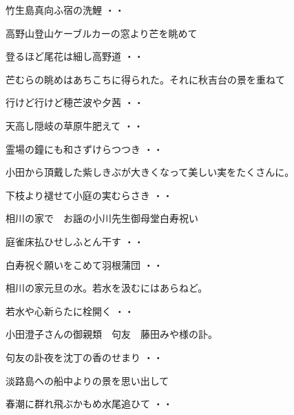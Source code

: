 \begin{shiika}竹生島真向ふ宿の洗鯉
\hfill{・・}\end{shiika}
\vspace{0.6cm}
高野山登山ケーブルカーの窓より芒を眺めて
\begin{shiika}登るほど尾花は細し高野道
\hfill{・・}\end{shiika}
\vspace{0.6cm}
芒むらの眺めはあちこちに得られた。それに秋吉台の景を重ねて
\begin{shiika}行けど行けど穂芒波や夕茜
\hfill{・・}\end{shiika}
\vspace{0.6cm}
\begin{shiika}天高し隠岐の草原牛肥えて
\hfill{・・}\end{shiika}
\begin{shiika}霊場の鐘にも和さずけらつつき
\hfill{・・}\end{shiika}
\vspace{0.6cm}
小田から頂戴した紫しきぶが大きくなって美しい実をたくさんに。
\begin{shiika}下枝より褪せて小庭の実むらさき
\hfill{・・}\end{shiika}
\vspace{0.6cm}
相川の家で　お謡の小川先生御母堂白寿祝い
\begin{shiika}庭雀床払ひせしふとん干す
\hfill{・・}\end{shiika}
\begin{shiika}白寿祝ぐ願いをこめて羽根蒲団
\hfill{・・}\end{shiika}
相川の家元旦の水。若水を汲むにはあらねど。
\begin{shiika}若水や心新らたに栓開く
\hfill{・・}\end{shiika}
\vspace{0.6cm}
小田澄子さんの御親類　句友　藤田みや様の訃。
\begin{shiika}句友の訃夜を沈丁の香のせまり
\hfill{・・}\end{shiika}
\vspace{0.6cm}
淡路島への船中よりの景を思い出して
\begin{shiika}春潮に群れ飛ぶかもめ水尾追ひて
\hfill{・・}\end{shiika}
